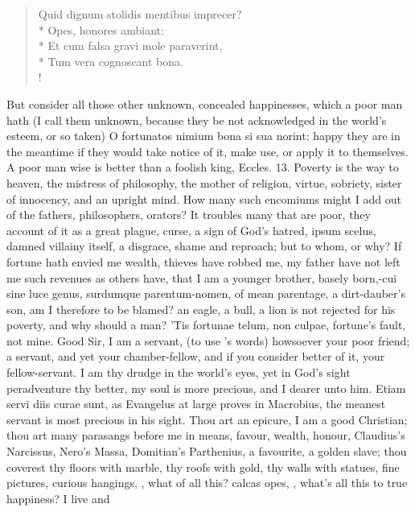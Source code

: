 {\begin{latin}
\begin{verse}
Quid dignum stolidis mentibus imprecer?\\*
Opes, honores ambiant:\\*
Et cum falsa gravi mole paraverint,\\*
Tum vera cognoscant bona.\\!
\end{verse}
\end{latin}
%
But consider all those other unknown, concealed happinesses, which a
poor man hath (I call them unknown, because they be not acknowledged in
the world's esteem, or so taken) O fortunatos nimium bona si sua
norint: happy they are in the meantime if they would take notice of it,
make use, or apply it to themselves. A poor man wise is better than a
foolish king, Eccles.  13. Poverty is the way to heaven,
the mistress of philosophy, the mother of religion, virtue,
sobriety, sister of innocency, and an upright mind. How many such
encomiums might I add out of the fathers, philosophers, orators? It
troubles many that are poor, they account of it as a great plague,
curse, a sign of God's hatred, ipsum scelus, damned villainy itself, a
disgrace, shame and reproach; but to whom, or why? If fortune
hath envied me wealth, thieves have robbed me, my father have not left
me such revenues as others have, that I am a younger brother, basely
born,-cui sine luce genus, surdumque parentum-nomen, of mean parentage,
a dirt-dauber's son, am I therefore to be blamed? an eagle, a bull, a
lion is not rejected for his poverty, and why should a man? 'Tis
fortunae telum, non culpae, fortune's fault, not mine. Good Sir,
I am a servant, (to use \Seneca's words) howsoever your poor
friend; a servant, and yet your chamber-fellow, and if you consider
better of it, your fellow-servant. I am thy drudge in the world's eyes,
yet in God's sight peradventure thy better, my soul is more precious,
and I dearer unto him. Etiam servi diis curae sunt, as Evangelus at
large proves in Macrobius, the meanest servant is most precious in his
sight. Thou art an epicure, I am a good Christian; thou art many
parasangs before me in means, favour, wealth, honour, Claudius's
Narcissus, Nero's Massa, Domitian's Parthenius, a favourite, a golden
slave; thou coverest thy floors with marble, thy roofs with gold, thy
walls with statues, fine pictures, curious hangings, \etc{}, what of all
this? calcas opes, \etc{}, what's all this to true happiness? I live and
}
